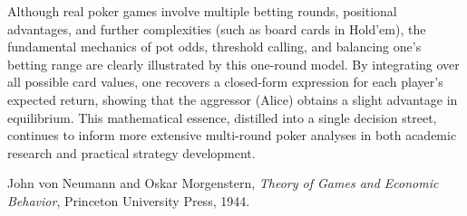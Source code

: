 \documentclass{article}
\begin{document}
Although real poker games involve multiple betting rounds, positional advantages, and further complexities (such as board cards in Hold'em), the fundamental mechanics of pot odds, threshold calling, and balancing one's betting range are clearly illustrated by this one-round model. By integrating over all possible card values, one recovers a closed-form expression for each player's expected return, showing that the aggressor (Alice) obtains a slight advantage in equilibrium. This mathematical essence, distilled into a single decision street, continues to inform more extensive multi-round poker analyses in both academic research and practical strategy development.




\begin{thebibliography}{9}

John von Neumann and Oskar Morgenstern,
\emph{Theory of Games and Economic Behavior},
Princeton University Press, 1944.

\end{thebibliography}
\end{document}
